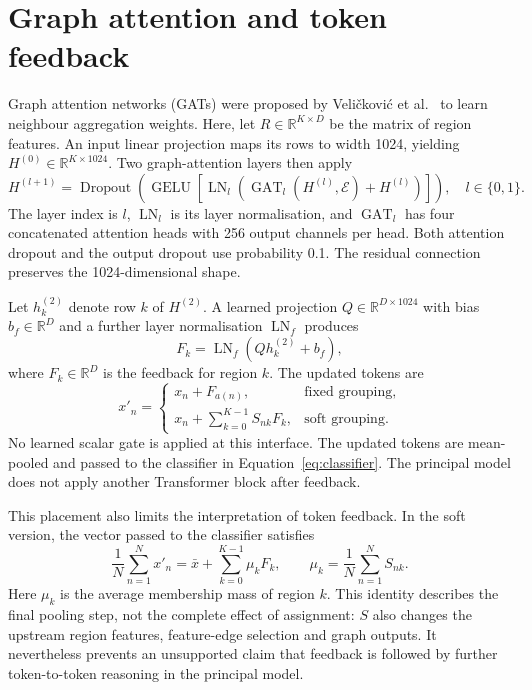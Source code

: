 \section{Graph attention and token feedback}

Graph attention networks (GATs) were proposed by
Veli\v{c}kovi\'{c} et al.~\cite{velickovic2018gat} to learn neighbour
aggregation weights. Here, let $R\in\mathbb{R}^{K\times D}$ be the matrix
of region features. An input linear projection maps its rows to width 1024,
yielding $H^{(0)}\in\mathbb{R}^{K\times1024}$. Two graph-attention layers
then apply
\begin{equation}
 H^{(l+1)}=\operatorname{Dropout}\!\left(
  \operatorname{GELU}\!\left[
  \operatorname{LN}_{l}\!\left(
   \operatorname{GAT}_{l}(H^{(l)},\mathcal{E})+H^{(l)}
  \right)\right]\right),\quad l\in\{0,1\}.
 \label{eq:gat-block}
\end{equation}
The layer index is $l$, $\operatorname{LN}_{l}$ is its layer normalisation,
and $\operatorname{GAT}_{l}$ has four concatenated attention heads with 256
output channels per head. Both attention dropout and the output dropout use
probability 0.1. The residual connection preserves the 1024-dimensional shape.

Let $h_k^{(2)}$ denote row $k$ of $H^{(2)}$. A learned projection
$Q\in\mathbb{R}^{D\times1024}$ with bias $b_f\in\mathbb{R}^{D}$ and a
further layer normalisation $\operatorname{LN}_{f}$ produces
\begin{equation}
 F_k=\operatorname{LN}_{f}(Qh_k^{(2)}+b_f),
 \label{eq:region-feedback}
\end{equation}
where $F_k\in\mathbb{R}^{D}$ is the feedback for region $k$. The updated
tokens are
\begin{equation}
 x'_n=
 \begin{cases}
 x_n+F_{a(n)}, & \text{fixed grouping},\\
 x_n+\sum_{k=0}^{K-1}S_{nk}F_k, & \text{soft grouping}.
 \end{cases}
 \label{eq:token-feedback}
\end{equation}
No learned scalar gate is applied at this interface. The updated tokens are
mean-pooled and passed to the classifier in Equation~\eqref{eq:classifier}.
The principal model does not apply another Transformer block after feedback.

This placement also limits the interpretation of token feedback. In the soft
version, the vector passed to the classifier satisfies
\begin{equation}
 \frac{1}{N}\sum_{n=1}^{N}x'_n
 =\bar{x}+\sum_{k=0}^{K-1}\mu_kF_k,
 \qquad
 \mu_k=\frac{1}{N}\sum_{n=1}^{N}S_{nk}.
 \label{eq:pooled-feedback}
\end{equation}
Here $\mu_k$ is the average membership mass of region $k$. This identity
describes the final pooling step, not the complete effect of assignment:
$S$ also changes the upstream region features, feature-edge selection and
graph outputs. It nevertheless prevents an unsupported claim that feedback
is followed by further token-to-token reasoning in the principal model.


